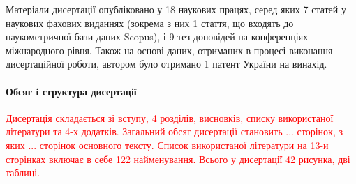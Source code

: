 Матеріали дисертації опубліковано у 18 наукових працях, серед яких 7
статей у наукових фахових виданнях (зокрема з них 1 стаття, що входять до 
наукометричної бази даних Scopus), і 9 тез доповідей на конференціях 
міжнародного рівня. Також на основі даних, отриманих в процесі виконання 
дисертаційної роботи, автором було отримано 1 патент України на винахід.

\paragraph{Обсяг і структура дисертації}

\textcolor{red}{Дисертація складається зі вступу, 4 розділів, висновків, списку використаної 
літератури та 4-х додатків. Загальний обсяг дисертації становить ... сторінок, з 
яких ... сторінок основного тексту. Список використаної літератури на 13-и 
сторінках включає в себе 122 найменування. Всього у дисертації 42 рисунка, 
дві таблиці.}








